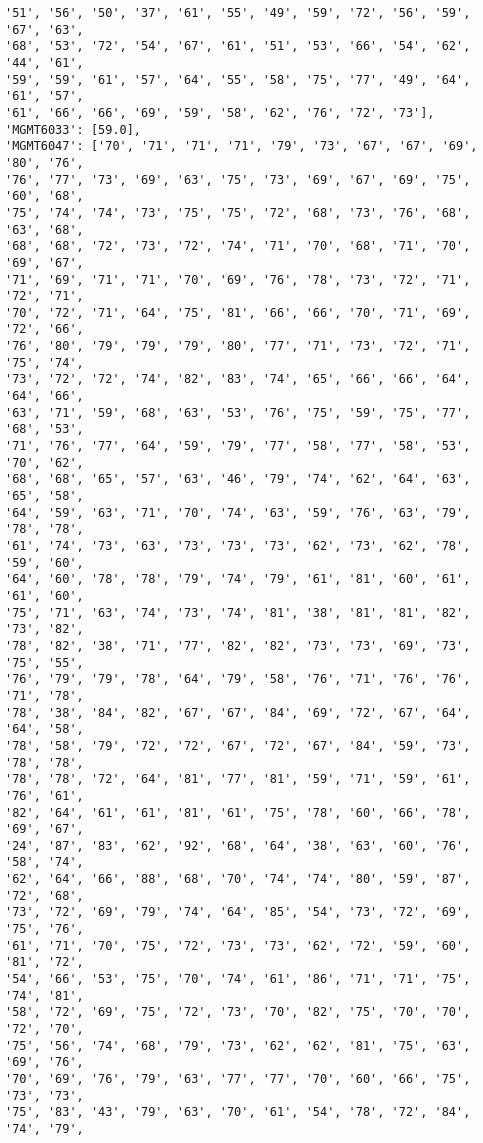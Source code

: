 \documentclass[11pt]{article}
\begin{document}
\begin{Verbatim}[commandchars=\\\{\}]
'51', '56', '50', '37', '61', '55', '49', '59', '72', '56', '59', '67', '63',
'68', '53', '72', '54', '67', '61', '51', '53', '66', '54', '62', '44', '61',
'59', '59', '61', '57', '64', '55', '58', '75', '77', '49', '64', '61', '57',
'61', '66', '66', '69', '59', '58', '62', '76', '72', '73'], 'MGMT6033': [59.0],
'MGMT6047': ['70', '71', '71', '71', '79', '73', '67', '67', '69', '80', '76',
'76', '77', '73', '69', '63', '75', '73', '69', '67', '69', '75', '60', '68',
'75', '74', '74', '73', '75', '75', '72', '68', '73', '76', '68', '63', '68',
'68', '68', '72', '73', '72', '74', '71', '70', '68', '71', '70', '69', '67',
'71', '69', '71', '71', '70', '69', '76', '78', '73', '72', '71', '72', '71',
'70', '72', '71', '64', '75', '81', '66', '66', '70', '71', '69', '72', '66',
'76', '80', '79', '79', '79', '80', '77', '71', '73', '72', '71', '75', '74',
'73', '72', '72', '74', '82', '83', '74', '65', '66', '66', '64', '64', '66',
'63', '71', '59', '68', '63', '53', '76', '75', '59', '75', '77', '68', '53',
'71', '76', '77', '64', '59', '79', '77', '58', '77', '58', '53', '70', '62',
'68', '68', '65', '57', '63', '46', '79', '74', '62', '64', '63', '65', '58',
'64', '59', '63', '71', '70', '74', '63', '59', '76', '63', '79', '78', '78',
'61', '74', '73', '63', '73', '73', '73', '62', '73', '62', '78', '59', '60',
'64', '60', '78', '78', '79', '74', '79', '61', '81', '60', '61', '61', '60',
'75', '71', '63', '74', '73', '74', '81', '38', '81', '81', '82', '73', '82',
'78', '82', '38', '71', '77', '82', '82', '73', '73', '69', '73', '75', '55',
'76', '79', '79', '78', '64', '79', '58', '76', '71', '76', '76', '71', '78',
'78', '38', '84', '82', '67', '67', '84', '69', '72', '67', '64', '64', '58',
'78', '58', '79', '72', '72', '67', '72', '67', '84', '59', '73', '78', '78',
'78', '78', '72', '64', '81', '77', '81', '59', '71', '59', '61', '76', '61',
'82', '64', '61', '61', '81', '61', '75', '78', '60', '66', '78', '69', '67',
'24', '87', '83', '62', '92', '68', '64', '38', '63', '60', '76', '58', '74',
'62', '64', '66', '88', '68', '70', '74', '74', '80', '59', '87', '72', '68',
'73', '72', '69', '79', '74', '64', '85', '54', '73', '72', '69', '75', '76',
'61', '71', '70', '75', '72', '73', '73', '62', '72', '59', '60', '81', '72',
'54', '66', '53', '75', '70', '74', '61', '86', '71', '71', '75', '74', '81',
'58', '72', '69', '75', '72', '73', '70', '82', '75', '70', '70', '72', '70',
'75', '56', '74', '68', '79', '73', '62', '62', '81', '75', '63', '69', '76',
'70', '69', '76', '79', '63', '77', '77', '70', '60', '66', '75', '73', '73',
'75', '83', '43', '79', '63', '70', '61', '54', '78', '72', '84', '74', '79',

\end{Verbatim}
\end{document}
